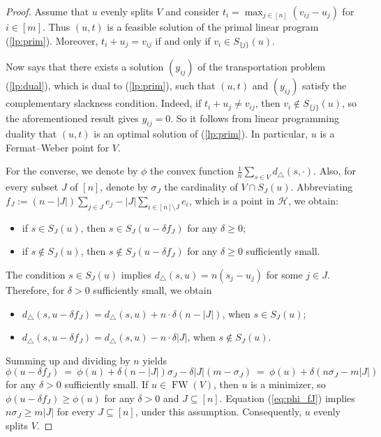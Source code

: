 \documentclass[a4paper,12pt]{amsart}
\newcommand\cH{{\mathcal H}}
\DeclareMathOperator{\FW}{FW} %
\theoremstyle{remark}
\begin{document}
\begin{proof}
  Assume that $u$ evenly splits $V$ and consider $t_i=\max_{j\in[n]}(v_{ij}-u_j)$ for $i\in[m]$.
  Thus $(u,t)$ is a feasible solution of the primal linear program (\ref{lp:prim}).
  Moreover, $t_i+u_j=v_{ij}$ if and only if $v_i\in S_{\{j\}}(u)$.
  
  Now \cite[Theorem 2.2]{Tokuyama+Nakano:1995} says that there exists a solution $(y_{ij})$ of the transportation problem (\ref{lp:dual}), which is dual to (\ref{lp:prim}), such that $(u,t)$ and $(y_{ij})$ satisfy the complementary slackness condition.
  Indeed, if $t_i+u_j\neq v_{ij}$, then $v_i\notin S_{\{j\}}(u)$, so the aforementioned result gives $y_{ij}=0$.
  So it follows from linear programming duality that $(u,t)$ is an optimal solution of (\ref{lp:prim}).
  In particular, $u$ is a Fermat--Weber point for $V$.
  
  For the converse, we denote by $\phi$ the convex function $\tfrac{1}{n}\sum_{s\in V}d_\triangle(s,\cdot)$.
  Also, for every subset $J$ of $[n]$, denote by $\sigma_J$ the cardinality of $V\cap S_J(u)$.
  Abbreviating $f_J:=(n-|J|)\sum_{j\in J}e_j-|J|\sum_{i\in[n]\setminus J}e_i$, which is a point in $\cH$, we obtain:
  \begin{itemize}
  \item if $s\in S_J(u)$, then $s\in S_J(u-\delta f_J)$ for any $\delta\geq 0$;
  \item if $s\notin S_J(u)$, then $s\notin S_J(u-\delta f_J)$ for any $\delta\geq 0$ sufficiently small.
  \end{itemize}
  The condition $s\in S_J(u)$ implies $d_\triangle(s,u)=n(s_j-u_j)$ for some $j\in J$.
  Therefore, for $\delta>0$ sufficiently small, we obtain
  \begin{itemize}
  \item $d_\triangle(s,u-\delta f_J)=d_\triangle(s,u)+n\cdot\delta(n-|J|)$, when $s\in S_J(u)$;
  \item $d_\triangle(s,u-\delta f_J)=d_\triangle(s,u)-n\cdot\delta|J|$, when $s\notin S_J(u)$.
  \end{itemize}
  Summing up and dividing by $n$ yields
  \begin{equation} \label{eq:phi_fJ}
    \phi(u-\delta f_J) \ = \ \phi(u)+\delta(n-|J|)\sigma_J-\delta|J|(m-\sigma_J) \ = \ \phi(u)+\delta\left(n\sigma_J-m|J|\right)
  \end{equation}
  for any $\delta> 0$ sufficiently small.
  If $u\in\FW(V)$, then $u$ is a minimizer, so $\phi(u-\delta f_J)\geq \phi(u)$ for any $\delta>0$ and $J\subseteq [n]$.
  Equation (\ref{eq:phi_fJ}) implies $n\sigma_J\geq m|J|$ for every $J\subseteq[n]$, under this assumption.
  Consequently, $u$ evenly splits $V$.
\end{proof}
\end{document}
